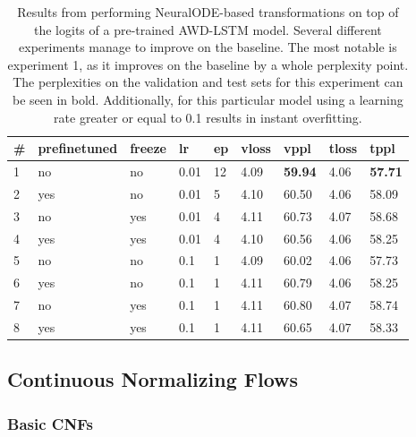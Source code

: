 \begin{table}
\centering
\caption{Results from performing NeuralODE-based transformations on top of the logits of a pre-trained AWD-LSTM model. Several different experiments manage to improve on the baseline. The most notable is experiment 1, as it improves on the baseline by a whole perplexity point. The perplexities on the validation and test sets for this experiment can be seen in bold. Additionally, for this particular model using a learning rate greater or equal to 0.1 results in instant overfitting.}

\begin{tabular}{|l|l|l|l|l|l|l|l|l|}
\hline
\textbf{\#} & \textbf{prefinetuned} & \textbf{freeze} & \textbf{lr} & \textbf{ep} & \textbf{vloss} & \textbf{vppl} & \textbf{tloss} & \textbf{tppl} \\ \hline
1       & no        & no        & 0.01      & 12        & 4.09      & \textbf{59.94}     & 4.06      & \textbf{57.71} \\ \hline
2       & yes       & no        & 0.01      & 5         & 4.10      & 60.50     & 4.06      & 58.09 \\ \hline
3       & no        & yes       & 0.01      & 4         & 4.11      & 60.73     & 4.07      & 58.68 \\ \hline
4       & yes       & yes       & 0.01      & 4         & 4.10      & 60.56     & 4.06      & 58.25 \\ \hline
5       & no        & no        & 0.1       & 1         & 4.09      & 60.02     & 4.06      & 57.73 \\ \hline
6       & yes       & no        & 0.1       & 1         & 4.11      & 60.79     & 4.06      & 58.25 \\ \hline
7       & no        & yes       & 0.1       & 1         & 4.11      & 60.80     & 4.07      & 58.74 \\ \hline
8       & yes       & yes       & 0.1       & 1         & 4.11      & 60.65     & 4.07      & 58.33 \\ \hline
\end{tabular}
\label{table:experiments:neural_odes}
\end{table}


\subsection{Continuous Normalizing Flows}

\subsubsection{Basic CNFs}

